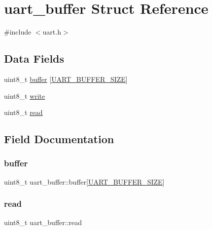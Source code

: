 \hypertarget{structuart__buffer}{}\section{uart\+\_\+buffer Struct Reference}
\label{structuart__buffer}


{\ttfamily \#include $<$uart.\+h$>$}

\subsection*{Data Fields}
\begin{DoxyCompactItemize}
\item 
uint8\+\_\+t \hyperlink{structuart__buffer_a93583c3c9260d4ffed5c6d73c124665c}{buffer} \mbox{[}\hyperlink{config_8h_a0d57378e32bf8278011460740bc29f7f}{U\+A\+R\+T\+\_\+\+B\+U\+F\+F\+E\+R\+\_\+\+S\+I\+ZE}\mbox{]}
\item 
uint8\+\_\+t \hyperlink{structuart__buffer_aa8b5a4f36a111c66fce870c3e236f07f}{write}
\item 
uint8\+\_\+t \hyperlink{structuart__buffer_a72588a273227ee9af798142cad041fca}{read}
\end{DoxyCompactItemize}


\subsection{Field Documentation}
\mbox{\label{structuart__buffer_a93583c3c9260d4ffed5c6d73c124665c}} 
\subsubsection{\texorpdfstring{buffer}{buffer}}
{\footnotesize\ttfamily uint8\+\_\+t uart\+\_\+buffer\+::buffer\mbox{[}\hyperlink{config_8h_a0d57378e32bf8278011460740bc29f7f}{U\+A\+R\+T\+\_\+\+B\+U\+F\+F\+E\+R\+\_\+\+S\+I\+ZE}\mbox{]}}

\mbox{\label{structuart__buffer_a72588a273227ee9af798142cad041fca}} 
\subsubsection{\texorpdfstring{read}{read}}
{\footnotesize\ttfamily uint8\+\_\+t uart\+\_\+buffer\+::read}

